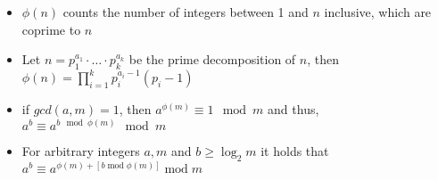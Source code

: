 \begin{itemize}
	\item $\phi \left(n\right)$ counts the number of integers between 1 and $n$ inclusive, which are coprime to $n$
	\item Let $n = p_1^{a_1} \cdot \dots \cdot p_k^{a_k}$ be the prime decomposition of $n$, then $\phi \left(n\right) =  \prod_{i = 1}^{k}p_i^{a_i - 1}\left(p_i - 1\right)$
	\item if $gcd\left(a, m\right) = 1$, then $a^{\phi(m)} \equiv 1 \mod m$ and thus, $a^{b} \equiv a^{b\mod  \phi \left(m\right)}\mod m$ 
	\item For arbitrary integers $a, m$ and $b \geq  \log_2m$ it holds that $a^b\equiv a^{ \phi \left(m\right) + \left[b \operatorname{mod}  \phi \left(m\right)\right]} \operatorname{mod} m$
\end{itemize}